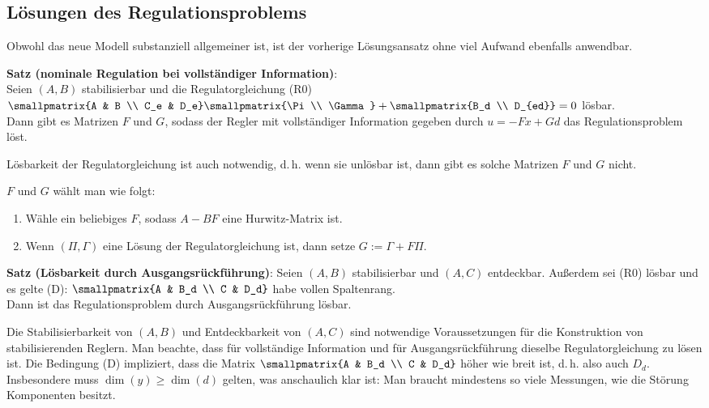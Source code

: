 \pagebreak

\subsection{%
    Lösungen des Regulationsproblems%
}

Obwohl das neue Modell substanziell allgemeiner ist, ist der vorherige Lösungsansatz ohne viel
Aufwand ebenfalls anwendbar.

\textbf{Satz (nominale Regulation bei vollständiger Information)}:\\
Seien $(A, B)$ stabilisierbar und die Regulatorgleichung (R0)
$\smallpmatrix{A & B \\ C_e & D_e} \smallpmatrix{\Pi \\ \Gamma} +
\smallpmatrix{B_d \\ D_{ed}} = 0$
lösbar.\\
Dann gibt es Matrizen $F$ und $G$, sodass der Regler mit vollständiger
Information gegeben durch $u = -Fx + Gd$ das Regulationsproblem löst.

Lösbarkeit der Regulatorgleichung ist auch notwendig, d.\,h. wenn sie unlösbar ist,
dann gibt es solche Matrizen $F$ und $G$ nicht.

$F$ und $G$ wählt man wie folgt:
\begin{enumerate}
    \item
    Wähle ein beliebiges $F$, sodass $A - BF$ eine Hurwitz-Matrix ist.
    
    \item
    Wenn $(\Pi, \Gamma)$ eine Lösung der Regulatorgleichung ist,
    dann setze $G := \Gamma + F\Pi$.
\end{enumerate}

\linie

\textbf{Satz (Lösbarkeit durch Ausgangsrückführung)}:
Seien $(A, B)$ stabilisierbar und $(A, C)$ entdeckbar.
Außerdem sei (R0) lösbar und es gelte (D): $\smallpmatrix{A & B_d \\ C & D_d}$ habe vollen
Spaltenrang.\\
Dann ist das Regulationsproblem durch Ausgangsrückführung lösbar.

Die Stabilisierbarkeit von $(A, B)$ und Entdeckbarkeit von $(A, C)$ sind notwendige Voraussetzungen
für die Konstruktion von stabilisierenden Reglern.
Man beachte, dass für vollständige Information und für Ausgangsrückführung dieselbe
Regulatorgleichung zu lösen ist.
Die Bedingung (D) impliziert, dass die Matrix $\smallpmatrix{A & B_d \\ C & D_d}$ höher wie
breit ist, d.\,h. also auch $D_d$.
Insbesondere muss $\dim(y) \ge \dim(d)$ gelten, was anschaulich klar ist:
Man braucht mindestens so viele Messungen, wie die Störung Komponenten besitzt.

